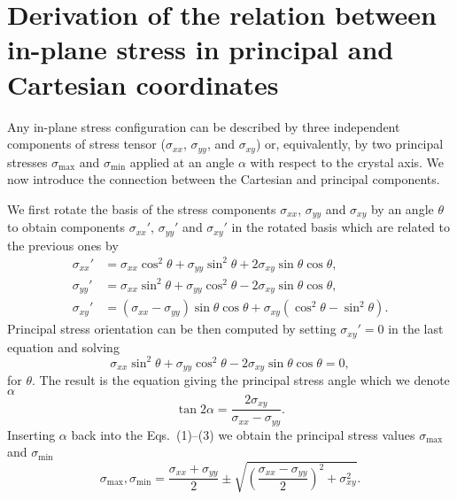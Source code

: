 \chapter{Derivation of the relation between in-plane stress in principal and Cartesian coordinates}
\label{app:principal_stress}

Any in-plane stress configuration can be described by three independent components of stress tensor ($\sigma_{xx}$, $\sigma_{yy}$, and $\sigma_{xy}$) or, equivalently, by two principal stresses $\sigma_\mathrm{max}$ and $\sigma_\mathrm{min}$ applied at an angle $\alpha$ with respect to the crystal axis. We now introduce the connection between the Cartesian and principal components.

We first rotate the basis of the stress components $\sigma_{xx}$, $\sigma_{yy}$ and $\sigma_{xy}$ by an angle $\theta$ to obtain components $\sigma_{xx}'$, $\sigma_{yy}'$ and $\sigma_{xy}'$ in the rotated basis which are related to the previous ones by
%
\begin{align}
\sigma_{xx}' &= \sigma_{xx}\cos^2{\theta}+\sigma_{yy}\sin^2{\theta}+2\sigma_{xy}\sin{\theta}\cos{\theta} , \\
\sigma_{yy}' &=\sigma_{xx}\sin^2{\theta}+\sigma_{yy}\cos^2{\theta}-2\sigma_{xy}\sin{\theta}\cos{\theta}, \\
\sigma_{xy}' &=\left(\sigma_{xx}-\sigma_{yy}\right)\sin{\theta}\cos{\theta}+\sigma_{xy}\left(\cos^2{\theta}-\sin^2{\theta}\right).
\end{align}
%
%
%
%
Principal stress orientation can be then computed by setting $\sigma_{xy}'=0$ in the last equation and solving
%
%
\begin{equation}
\sigma_{xx}\sin^2{\theta}+\sigma_{yy}\cos^2{\theta}-2\sigma_{xy}\sin{\theta}\cos{\theta}=0,
\end{equation}
%
%
for $\theta$. The result is the equation giving the principal stress angle which we denote $\alpha$
%
%
\begin{equation}
\tan{2\alpha}=\frac{2\sigma_{xy}}{\sigma_{xx}-\sigma_{yy}}\label{eq:principal_angle}.
\end{equation}
%
Inserting $\alpha$ back into the Eqs.~(1)--(3) we obtain the principal stress values $\sigma_\mathrm{max}$ and $\sigma_\mathrm{min}$
%
%
\begin{equation}
\sigma_\mathrm{max}, \sigma_\mathrm{min} = \frac{\sigma_{xx}+\sigma_{yy}}{2} \pm \sqrt{\left(\frac{\sigma_{xx}-\sigma_{yy}}{2}\right)^2+\sigma_{xy}^2}. \label{eq:princip_strain}
\end{equation}
%
%



